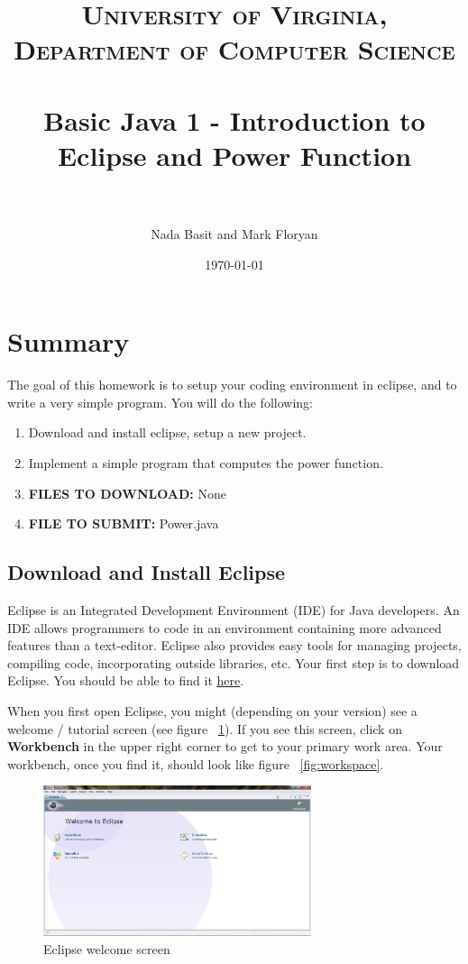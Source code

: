 \documentclass[paper=a4, fontsize=11pt, parskip=full]{scrartcl} %
\title{	
\normalfont \normalsize 
\textsc{University of Virginia, Department of Computer Science} \\ [25pt] %
\horrule{0.5pt} \\[0.4cm] %
\huge Basic Java 1 - Introduction to Eclipse and Power Function \\ %
\horrule{2pt} \\[0.5cm] %
}
\author{Nada Basit and Mark Floryan}
\date{\normalsize\today} %
\numberwithin{equation}{section} %
\numberwithin{figure}{section} %
\numberwithin{table}{section} %
\begin{document}
\maketitle %


\section{Summary}

The goal of this homework is to setup your coding environment in eclipse, and to write a very simple program. You will do the following:

\begin{enumerate}
	\item Download and install eclipse, setup a new project.
	\item Implement a simple program that computes the power function.
	\item \textbf{FILES TO DOWNLOAD:} None
	\item \textbf{FILE TO SUBMIT:} Power.java
\end{enumerate}


\subsection{Download and Install Eclipse}

Eclipse is an Integrated Development Environment (IDE) for Java developers. An IDE allows programmers to code in an environment containing more advanced features than a text-editor. Eclipse also provides easy tools for managing projects, compiling code, incorporating outside libraries, etc. Your first step is to download Eclipse. You should be able to find it \href{https://www.eclipse.org/downloads/}{here}.

When you first open Eclipse, you might (depending on your version) see a welcome / tutorial screen (see figure ~\ref{fig:welcome}). If you see this screen, click on \textbf{Workbench} in the upper right corner to get to your primary work area. Your workbench, once you find it, should look like figure ~\ref{fig:workspace}.

\begin{figure}[H]
\centering
\includegraphics[width=0.7\textwidth]{images/eclipse_welcome.png}
\caption{Eclipse welcome screen}
\label{fig:welcome}
\end{figure}
\end{document}
